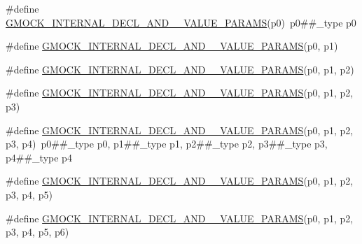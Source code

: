 \begin{DoxyCompactItemize}
\item 
\#define \mbox{\hyperlink{_obj__test_2lib_2googletest-master_2googlemock_2include_2gmock_2gmock-generated-actions_8h_a4440fd8222dde30e41f05209f06a2d00}{G\+M\+O\+C\+K\+\_\+\+I\+N\+T\+E\+R\+N\+A\+L\+\_\+\+D\+E\+C\+L\+\_\+\+A\+N\+D\+\_\+\_\+\+V\+A\+L\+U\+E\+\_\+\+P\+A\+R\+A\+MS}}(p0)~p0\#\#\+\_\+type p0
\item 
\#define \mbox{\hyperlink{_obj__test_2lib_2googletest-master_2googlemock_2include_2gmock_2gmock-generated-actions_8h_ab11df3777b85b01132aa4057017b22ca}{G\+M\+O\+C\+K\+\_\+\+I\+N\+T\+E\+R\+N\+A\+L\+\_\+\+D\+E\+C\+L\+\_\+\+A\+N\+D\+\_\+\_\+\+V\+A\+L\+U\+E\+\_\+\+P\+A\+R\+A\+MS}}(p0,  p1)
\item 
\#define \mbox{\hyperlink{_obj__test_2lib_2googletest-master_2googlemock_2include_2gmock_2gmock-generated-actions_8h_a81147c9dca4694a07acccd9324990585}{G\+M\+O\+C\+K\+\_\+\+I\+N\+T\+E\+R\+N\+A\+L\+\_\+\+D\+E\+C\+L\+\_\+\+A\+N\+D\+\_\+\_\+\+V\+A\+L\+U\+E\+\_\+\+P\+A\+R\+A\+MS}}(p0,  p1,  p2)
\item 
\#define \mbox{\hyperlink{_obj__test_2lib_2googletest-master_2googlemock_2include_2gmock_2gmock-generated-actions_8h_a0580c33b8405f1820a382f9b9471f157}{G\+M\+O\+C\+K\+\_\+\+I\+N\+T\+E\+R\+N\+A\+L\+\_\+\+D\+E\+C\+L\+\_\+\+A\+N\+D\+\_\+\_\+\+V\+A\+L\+U\+E\+\_\+\+P\+A\+R\+A\+MS}}(p0,  p1,  p2,  p3)
\item 
\#define \mbox{\hyperlink{_obj__test_2lib_2googletest-master_2googlemock_2include_2gmock_2gmock-generated-actions_8h_a0fd289b917553899d908b0f406f8f75d}{G\+M\+O\+C\+K\+\_\+\+I\+N\+T\+E\+R\+N\+A\+L\+\_\+\+D\+E\+C\+L\+\_\+\+A\+N\+D\+\_\+\_\+\+V\+A\+L\+U\+E\+\_\+\+P\+A\+R\+A\+MS}}(p0,  p1,  p2,  p3,  p4)~p0\#\#\+\_\+type p0, p1\#\#\+\_\+type p1, p2\#\#\+\_\+type p2, p3\#\#\+\_\+type p3, p4\#\#\+\_\+type p4
\item 
\#define \mbox{\hyperlink{_obj__test_2lib_2googletest-master_2googlemock_2include_2gmock_2gmock-generated-actions_8h_a80b3221bf467d72d15120045c9f52a6e}{G\+M\+O\+C\+K\+\_\+\+I\+N\+T\+E\+R\+N\+A\+L\+\_\+\+D\+E\+C\+L\+\_\+\+A\+N\+D\+\_\+\_\+\+V\+A\+L\+U\+E\+\_\+\+P\+A\+R\+A\+MS}}(p0,  p1,  p2,  p3,  p4,  p5)
\item 
\#define \mbox{\hyperlink{_obj__test_2lib_2googletest-master_2googlemock_2include_2gmock_2gmock-generated-actions_8h_af762ce6b60357100fd2c8176ef2f4102}{G\+M\+O\+C\+K\+\_\+\+I\+N\+T\+E\+R\+N\+A\+L\+\_\+\+D\+E\+C\+L\+\_\+\+A\+N\+D\+\_\+\_\+\+V\+A\+L\+U\+E\+\_\+\+P\+A\+R\+A\+MS}}(p0,  p1,  p2,  p3,  p4,  p5,  p6)
\item 

\end{DoxyCompactItemize}
